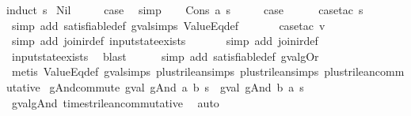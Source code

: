 \begin{isabellebody}
%
\isadelimproof
%
\endisadelimproof
%
\isatagproof
{}\isamarkupfalse%
{\isacharparenleft}induct\ s{\isacharparenright}\isanewline
{}\isamarkupfalse%
\ Nil\isanewline
\ \ \isamarkupfalse%
\ \isamarkupfalse%
\ {\isacharquery}case\ \isamarkupfalse%
\ simp\isanewline
{}\isamarkupfalse%
\isanewline
\ \ \isamarkupfalse%
\ {\isacharparenleft}Cons\ a\ s{\isacharparenright}\isanewline
\ \ \isamarkupfalse%
\ \isamarkupfalse%
\ {\isacharquery}case\isanewline
\ \ \ \ \isamarkupfalse%
\ {\isacharparenleft}case{\isacharunderscore}tac\ s{\isacharparenright}\isanewline
\ \ \ \ \ \isamarkupfalse%
\ {\isacharparenleft}simp\ add{\isacharcolon}\ satisfiable{\isacharunderscore}def\ gval{\isachardot}simps\ ValueEq{\isacharunderscore}def{\isacharparenright}\isanewline
\ \ \ \ \ \isamarkupfalse%
\ {\isacharparenleft}case{\isacharunderscore}tac\ v{\isacharparenright}\isanewline
\ \ \ \ \ \ \isamarkupfalse%
\ {\isacharparenleft}simp\ add{\isacharcolon}\ join{\isacharunderscore}ir{\isacharunderscore}def\ input{}state{\isacharunderscore}exists{\isacharparenright}\isanewline
\ \ \ \ \ \isamarkupfalse%
\ {\isacharparenleft}simp\ add{\isacharcolon}\ join{\isacharunderscore}ir{\isacharunderscore}def{\isacharparenright}\isanewline
\ \ \ \ \isamarkupfalse%
\ input{}state{\isacharunderscore}exists\ \isamarkupfalse%
\ blast\isanewline
\ \ \ \ \isamarkupfalse%
\ {\isacharparenleft}simp\ add{\isacharcolon}\ satisfiable{\isacharunderscore}def\ gval{\isacharunderscore}gOr{\isacharparenright}\isanewline
\ \ \ \ \isamarkupfalse%
\ {\isacharparenleft}metis\ ValueEq{\isacharunderscore}def\ gval{\isachardot}simps{\isacharparenleft}{}{\isacharparenright}\ plus{\isacharunderscore}trilean{\isachardot}simps{\isacharparenleft}{}{\isacharparenright}\ plus{\isacharunderscore}trilean{\isachardot}simps{\isacharparenleft}{}{\isacharparenright}\ plus{\isacharunderscore}trilean{\isacharunderscore}commutative{\isacharparenright}\isanewline
{}\isamarkupfalse%
%
\endisatagproof
{\isafoldproof}%
%
\isadelimproof
\isanewline
%
\endisadelimproof
\isanewline
{}\isamarkupfalse%
\ gAnd{\isacharunderscore}commute{\isacharcolon}\ {\isachardoublequoteopen}gval\ {\isacharparenleft}gAnd\ a\ b{\isacharparenright}\ s\ {\isacharequal}\ gval\ {\isacharparenleft}gAnd\ b\ a{\isacharparenright}\ s{\isachardoublequoteclose}\isanewline
%
\isadelimproof
\ \ %
\endisadelimproof
%
\isatagproof
{}\isamarkupfalse%
\ gval{\isacharunderscore}gAnd\ times{\isacharunderscore}trilean{\isacharunderscore}commutative\ \isamarkupfalse%
\ auto%
\endisatagproof
{\isafoldproof}%
%
\isadelimproof
\isanewline
%
\endisadelimproof
%
\isadelimtheory
\isanewline
%
\endisadelimtheory
%
\isatagtheory
{}\isamarkupfalse%
%
\endisatagtheory
{\isafoldtheory}%
%
\isadelimtheory
%
\endisadelimtheory
%
\end{isabellebody}%
